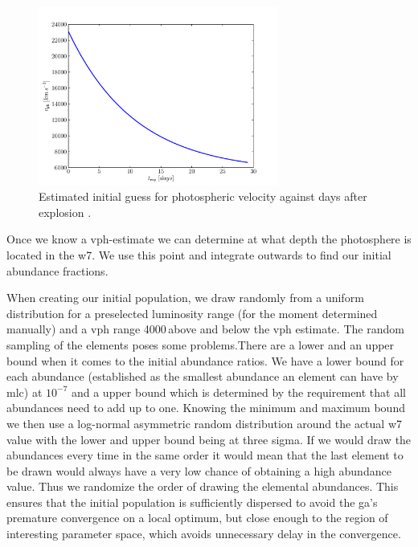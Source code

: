 \begin{figure}[htbp] %
   \centering
   \includegraphics[width=0.7\textwidth]{chapter_dalek/plots/plot_texp_vph.pdf} 
   \caption{Estimated initial guess for photospheric velocity against days after explosion \citep{2005ApJ...623.1011B}. }
   \label{fig:Intrinsic }
\end{figure} 

Once we know a \gls{vph}-estimate we can determine at what depth the photosphere is located in the \gls{w7}. We use this point and integrate outwards to find our initial abundance fractions.

When creating our initial population, we draw randomly from a uniform distribution for a preselected luminosity range (for the moment determined manually) and a \gls{vph} range 4000\,\kms above and below the \gls{vph} estimate. The random sampling of the elements poses some problems.There are a lower and an upper bound when it comes to the initial abundance ratios. We have a lower bound for each abundance (established as the smallest abundance an element can have by \gls{mlc}) at $10^{-7}$ and a upper bound which is determined by the requirement that all abundances need to add up to one. Knowing the minimum and maximum bound we then use a log-normal asymmetric random distribution around the actual \gls{w7} value with the lower and upper bound being at three sigma. If we would draw the abundances every time in the same order it would mean that the last element to be drawn would always have a very low chance of obtaining a high abundance value. Thus we randomize the order of drawing the elemental abundances. This ensures that the initial population is sufficiently dispersed to avoid the \gls{ga}'s premature convergence on a local optimum, but close enough to the region of interesting parameter space, which avoids unnecessary delay in the convergence. 

